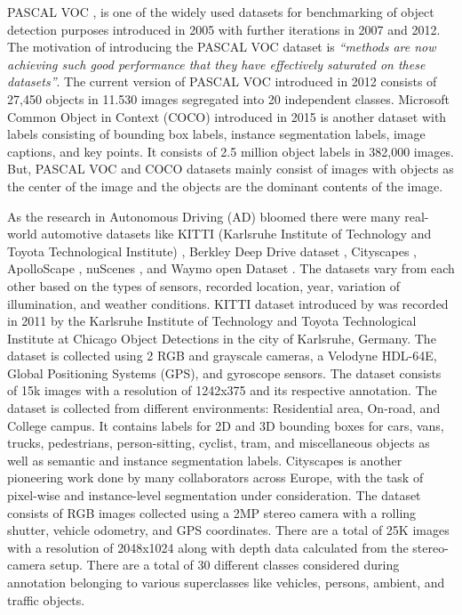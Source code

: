     PASCAL VOC \cite{pascalvoc}, is one of the widely used datasets for benchmarking of object detection purposes introduced in 2005 with further iterations in 2007 and 2012. The motivation of introducing the PASCAL VOC dataset is \textit{“methods are now achieving such good performance that they have effectively saturated on these datasets”}. The current version of PASCAL VOC introduced in 2012 consists of 27,450 objects in 11.530 images segregated into 20 independent classes. Microsoft Common Object in Context (COCO) introduced in 2015 is another dataset with labels consisting of bounding box labels, instance segmentation labels, image captions, and key points. It consists of 2.5 million object labels in 382,000 images. But, PASCAL VOC and COCO datasets mainly consist of images with objects as the center of the image and the objects are the dominant contents of the image.
    
    As the research in Autonomous Driving (AD) bloomed there were many real-world automotive datasets like KITTI (Karlsruhe Institute of Technology and Toyota Technological Institute) \cite{KITTI2012}, Berkley Deep Drive dataset \cite{bdd100k}, Cityscapes \cite{Cordts2016Cityscapes}, ApolloScape \cite{wang2019apolloscape}, nuScenes \cite{nuscenes2019}, and Waymo open Dataset \cite{sun2020scalability}. The datasets vary from each other based on the types of sensors, recorded location, year, variation of illumination, and weather conditions. KITTI dataset introduced by \citet{KITTI2012} was recorded in 2011 by the Karlsruhe Institute of Technology and Toyota Technological Institute at Chicago Object Detections in the city of Karlsruhe, Germany. The dataset is collected using 2 RGB and grayscale cameras, a Velodyne HDL-64E, Global Positioning Systems (GPS), and gyroscope sensors. The dataset consists of 15k images with a resolution of 1242x375 and its respective annotation. The dataset is collected from different environments: Residential area, On-road, and College campus. It contains labels for 2D and 3D bounding boxes for cars, vans, trucks, pedestrians, person-sitting, cyclist, tram, and miscellaneous objects as well as semantic and instance segmentation labels. Cityscapes is another pioneering work done by many collaborators across Europe, with the task of pixel-wise and instance-level segmentation under consideration. The dataset consists of RGB images collected using a 2MP stereo camera with a rolling shutter, vehicle odometry, and GPS coordinates. There are a total of 25K images with a resolution of 2048x1024 along with depth data calculated from the stereo-camera setup. There are a total of 30 different classes considered during annotation belonging to various superclasses like vehicles, persons, ambient, and traffic objects.
    
